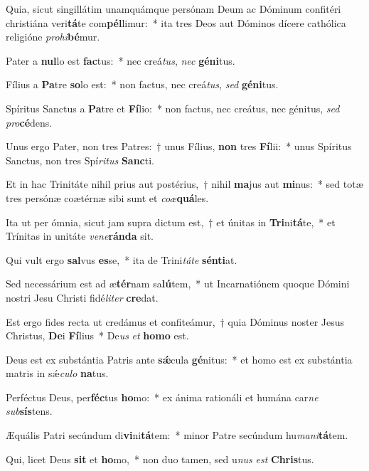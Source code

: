 \item Quia, sicut singillátim unamquámque persónam Deum ac Dóminum confitéri christiána veri\textbf{tá}te com\textbf{pél}limur:~* ita tres Deos aut Dóminos dícere cathólica religióne \textit{pro}\textit{hi}\textbf{bé}mur.
\item Pater a \textbf{nul}lo est \textbf{fac}tus:~* nec creá\textit{tus}, \textit{nec} \textbf{gé}\textbf{ni}tus.
\item Fílius a \textbf{Pa}tre \textbf{so}lo est:~* non factus, nec creá\textit{tus}, \textit{sed} \textbf{gé}\textbf{ni}tus.
\item Spíritus Sanctus a \textbf{Pa}tre et \textbf{Fí}lio:~* non factus, nec creátus, nec génitus, \textit{sed} \textit{pro}\textbf{cé}dens.
\item Unus ergo Pater, non tres Patres:~† unus Fílius, \textbf{non} tres \textbf{Fí}lii:~* unus Spíritus Sanctus, non tres Spí\textit{ri}\textit{tus} \textbf{Sanc}ti.
\item Et in hac Trinitáte nihil prius aut postérius,~† nihil \textbf{ma}jus aut \textbf{mi}nus:~* sed totæ tres persónæ coætérnæ sibi sunt et \textit{co}\textit{æ}\textbf{quá}les.
\item Ita ut per ómnia, sicut jam supra dictum est,~† et únitas in \textbf{Tri}ni\textbf{tá}te,~* et Trínitas in unitáte \textit{ve}\textit{ne}\textbf{rán}\textbf{da} sit.
\item Qui vult ergo \textbf{sal}vus \textbf{es}se,~* ita de Trini\textit{tá}\textit{te} \textbf{sén}\textbf{ti}at.
\item Sed necessárium est ad æ\textbf{tér}nam sa\textbf{lú}tem,~* ut Incarnatiónem quoque Dómini nostri Jesu Christi fidé\textit{li}\textit{ter} \textbf{cre}dat.
\item Est ergo fides recta ut credámus et confiteámur,~† quia Dóminus noster Jesus Christus, \textbf{De}i \textbf{Fí}lius~* De\textit{us} \textit{et} \textbf{ho}\textbf{mo} est.
\item Deus est ex substántia Patris ante \textbf{sǽ}cula \textbf{gé}nitus:~* et homo est ex substántia matris in sǽ\textit{cu}\textit{lo} \textbf{na}tus.
\item Perféctus Deus, per\textbf{féc}tus \textbf{ho}mo:~* ex ánima rationáli et humána car\textit{ne} \textit{sub}\textbf{sís}tens.
\item Æquális Patri secúndum di\textbf{vi}ni\textbf{tá}tem:~* minor Patre secúndum hu\textit{ma}\textit{ni}\textbf{tá}tem.
\item Qui, licet Deus \textbf{sit} et \textbf{ho}mo,~* non duo tamen, sed u\textit{nus} \textit{est} \textbf{Chris}tus.

